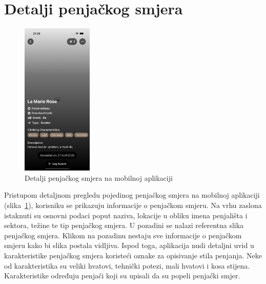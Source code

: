 \section{Detalji penjačkog smjera}

\begin{figure}[H]
    \centering
    \includegraphics[width=0.3\textwidth]{images/implementacija/route-details/route-details.png}
    \caption{Detalji penjačkog smjera na mobilnoj aplikaciji}
    \label{fig:detalji_smjera}
\end{figure}

Pristupom detaljnom pregledu pojedinog penjačkog smjera na mobilnoj aplikaciji (slika~\ref{fig:detalji_smjera}), korisniku se prikazuju informacije o penjačkom smjeru. Na vrhu zaslona istaknuti su osnovni podaci poput naziva, lokacije u obliku imena penjališta i sektora, težine te tip penjačkog smjera. 
U pozadini se nalazi referentna slika penjačkog smjera. Klikom na pozadinu nestaju sve informacije o penjačkom smjeru kako bi slika postala vidljiva. Ispod toga, aplikacija nudi detaljni uvid u karakteristike penjačkog smjera koristeći oznake za opisivanje stila penjanja. Neke od karakteristika su veliki hvatovi, tehnički potezi, mali hvatovi i kosa stijena. Karakteristike određuju penjači koji su upisali da su popeli penjački smjer.

